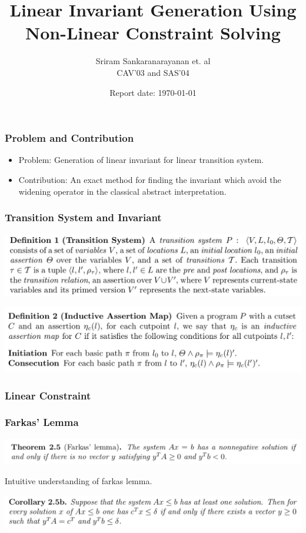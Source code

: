 \documentclass[11pt]{beamer}
\title{Linear Invariant Generation Using Non-Linear Constraint Solving}
\author{Sriram Sankaranarayanan et. al\\
CAV'03 and SAS'04
}
\date{Report date: \today}
\begin{document}
\maketitle

\begin{frame}\frametitle{Problem and Contribution}

\begin{itemize}
\item Problem: Generation of linear invariant for linear transition system.

\item Contribution: An exact method for finding the invariant which avoid the widening operator in the classical abstract interpretation.
\end{itemize}

\end{frame}

\begin{frame}\frametitle{Transition System and Invariant}
\begin{center}
\includegraphics[scale=0.25]{defts.png}

\includegraphics[scale=0.25]{defiam.png}
\end{center}

\end{frame}

\begin{frame}\frametitle{Linear Constraint}

\end{frame}

\begin{frame}\frametitle{Farkas' Lemma}
\begin{center}
\includegraphics[scale=0.23]{farkas.png}
\end{center}

Intuitive understanding of farkas lemma.

\begin{center}

\includegraphics[scale=0.23]{farkasco.png}
\end{center}

\end{frame}
\end{document}
